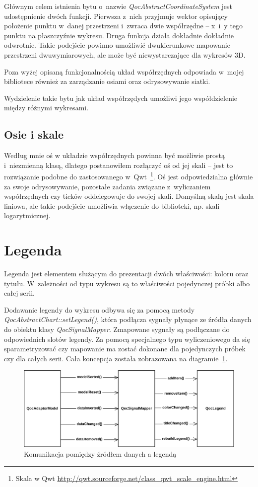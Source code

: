 Głównym celem istnienia bytu o~nazwie \textit{QocAbstractCoordinateSystem} jest udostępnienie dwóch funkcji. Pierwsza z~nich przyjmuje wektor opisujący położenie punktu w~danej przestrzeni i~zwraca dwie współrzędne -- x~i~y tego punktu na płaszczyźnie wykresu. Druga funkcja działa dokładnie dokładnie odwrotnie. Takie podejście powinno umożliwić dwukierunkowe mapowanie przestrzeni dwuwymiarowych, ale może być niewystarczające dla wykresów 3D. 

Poza wyżej opisaną funkcjonalnością układ współrzędnych odpowiada w~mojej bibliotece również za zarządzanie osiami oraz odrysowywanie siatki.

Wydzielenie takie bytu jak układ współrzędych umożliwi jego współdzielenie między różnymi wykresami.

\subsection{Osie i skale} 
Według mnie oś w układzie współrzędnych powinna być możliwie prostą i~niezmienną klasą, dlatego postanowiłem rozłączyć oś od jej skali -- jest to rozwiązanie podobne do zastosowanego w~Qwt~\footnote{Skala w Qwt \url{http://qwt.sourceforge.net/class\_qwt\_scale\_engine.html}}. Oś jest odpowiedzialna głównie za swoje odrysowywanie, pozostałe zadania związane z~wyliczaniem współrzędnych czy ticków oddelegowuje do swojej skali. Domyślną skalą jest skala liniowa, ale takie podejście umożliwia włączenie do biblioteki, np. skali logarytmicznej.

\section{Legenda}
Legenda jest elementem służącym do prezentacji dwóch właściwości: koloru oraz tytułu. W~zależności od typu wykresu są to właściwości pojedynczej próbki albo całej serii. 

Dodawanie legendy do wykresu odbywa się za pomocą metody \textit{QocAbstractChart::setLegend()}, która podłącza sygnały płynące ze źródła danych do obiektu klasy \textit{QocSignalMapper}. Zmapowane sygnały są podłączane do odpowiednich slotów legendy. Za pomocą specjalnego typu wyliczeniowego da się sparametryzować czy mapowanie ma zostać dokonane dla pojedynczych próbek czy dla całych serii. Cała koncepcja została zobrazowana na diagramie~\ref{rys:diag:legenda}.

\begin{figure}[H]
\centering
\includegraphics[scale=0.7]{img/legenda.pdf}
\caption{Komunikacja pomiędzy źródłem danych a legendą}\label{rys:diag:legenda}
\end{figure}

